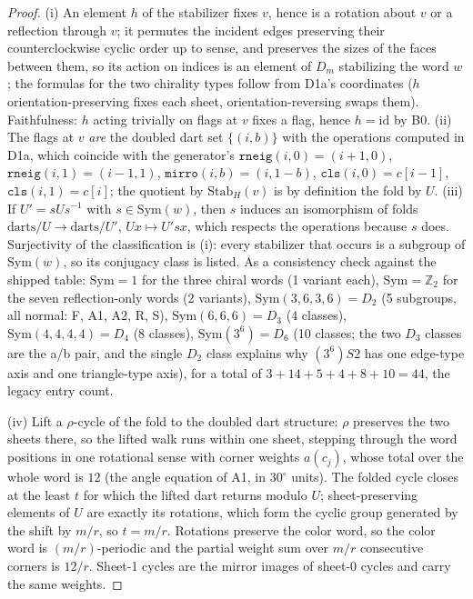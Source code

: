 \documentclass[11pt]{article}
\theoremstyle{definition}
\newcommand{\Stab}{\mathrm{Stab}}
\newcommand{\Sym}{\mathrm{Sym}}
\newcommand{\Z}{\mathbb{Z}}
\begin{document}
\begin{proof}
(i) An element $h$ of the stabilizer fixes $v$, hence is a rotation about $v$ or a
reflection through $v$; it permutes the incident edges preserving their counterclockwise
cyclic order up to sense, and preserves the sizes of the faces between them, so its
action on indices is an element of $D_m$ stabilizing the word $w$; the formulas for the
two chirality types follow from D1a's coordinates ($h$ orientation-preserving fixes each
sheet, orientation-reversing swaps them). Faithfulness: $h$ acting trivially on flags at
$v$ fixes a flag, hence $h = \mathrm{id}$ by B0. (ii) The flags at $v$ \emph{are} the
doubled dart set $\{(i,b)\}$ with the operations computed in D1a, which coincide with the
generator's $\texttt{rneig}(i,0)=(i{+}1,0)$, $\texttt{rneig}(i,1)=(i{-}1,1)$,
$\texttt{mirro}(i,b)=(i,1{-}b)$, $\texttt{cls}(i,0)=c[i{-}1]$, $\texttt{cls}(i,1)=c[i]$;
the quotient by $\Stab_H(v)$ is by definition the fold by $U$. (iii) If
$U' = sUs^{-1}$ with $s \in \Sym(w)$, then $s$ induces an isomorphism of folds
$\text{darts}/U \to \text{darts}/U'$, $Ux \mapsto U'sx$, which respects the operations
because $s$ does. Surjectivity of the classification is (i): every stabilizer that occurs
is a subgroup of $\Sym(w)$, so its conjugacy class is listed. As a consistency check
against the shipped table: $\Sym = 1$ for the three chiral words (1 variant each),
$\Sym = \Z_2$ for the seven reflection-only words (2 variants), $\Sym(3,6,3,6) = D_2$
(5 subgroups, all normal: F, A1, A2, R, S), $\Sym(6,6,6) = D_3$ (4 classes),
$\Sym(4,4,4,4) = D_4$ (8 classes), $\Sym(3^6) = D_6$ (10 classes; the two $D_3$ classes
are the a/b pair, and the single $D_2$ class explains why $(3^6)S2$ has one edge-type
axis and one triangle-type axis), for a total of
$3 + 14 + 5 + 4 + 8 + 10 = 44$, the legacy entry count.

(iv) Lift a $\rho$-cycle of the fold to the doubled dart structure: $\rho$ preserves the
two sheets there, so the lifted walk runs within one sheet, stepping through the word
positions in one rotational sense with corner weights $a(c_j)$, whose total over the
whole word is $12$ (the angle equation of A1, in $30^\circ$ units). The folded cycle
closes at the least $t$ for which the lifted dart returns modulo $U$; sheet-preserving
elements of $U$ are exactly its rotations, which form the cyclic group generated by the
shift by $m/r$, so $t = m/r$. Rotations preserve the color word, so the color word is
$(m/r)$-periodic and the partial weight sum over $m/r$ consecutive corners is $12/r$.
Sheet-1 cycles are the mirror images of sheet-0 cycles and carry the same weights.
\end{proof}
\end{document}
